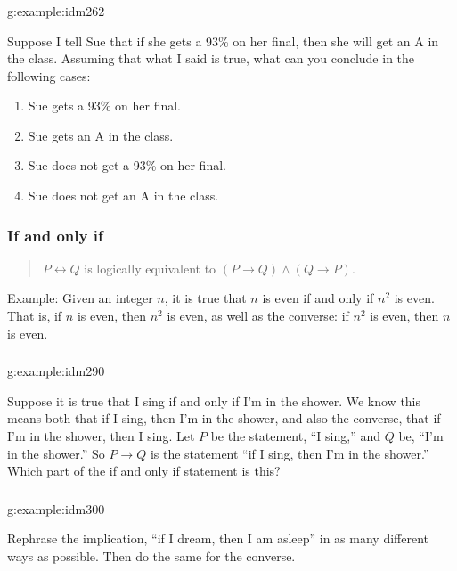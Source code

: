 \documentclass[11pt, compress]{beamer}
\renewcommand{\iff}{\leftrightarrow}
\newcommand{\imp}{\rightarrow}
\begin{document}
\begin{frame}
\frametitle{}
\begin{example}{}{g:example:idm262}%

Suppose I tell Sue that if she gets a 93\% on her final, then she will get an A in the class. Assuming that what I said is true, what can you conclude in the following cases:
\begin{enumerate}
\item{}
Sue gets a 93\% on her final.

\item{}
Sue gets an A in the class.

\item{}
Sue does not get a 93\% on her final.

\item{}
Sue does not get an A in the class.
\end{enumerate}\end{example}
\end{frame}
 
\begin{frame}
\frametitle{If and only if}
 \begin{quote}%

\(P \iff Q\) is logically equivalent to \((P \imp Q) \wedge (Q \imp P)\).\end{quote}
 
\pause 
Example: Given an integer \(n\), it is true that \(n\) is even if and only if \(n^2\) is even. That is, if \(n\) is even, then \(n^2\) is even, as well as the converse: if \(n^2\) is even, then \(n\) is even.\end{frame}
 
\begin{frame}
\frametitle{}
\begin{example}{}{g:example:idm290}%

Suppose it is true that I sing if and only if I'm in the shower. We know this means both that if I sing, then I'm in the shower, and also the converse, that if I'm in the shower, then I sing. Let \(P\) be the statement, ``I sing,'' and \(Q\) be, ``I'm in the shower.'' So \(P \imp Q\) is the statement ``if I sing, then I'm in the shower.'' Which part of the if and only if statement is this?\end{example}
\end{frame}
 
\begin{frame}
\frametitle{}
\begin{example}{}{g:example:idm300}%

Rephrase the implication, ``if I dream, then I am asleep'' in as many different ways as possible. Then do the same for the converse.\end{example}
\end{frame}
 
\end{document}
